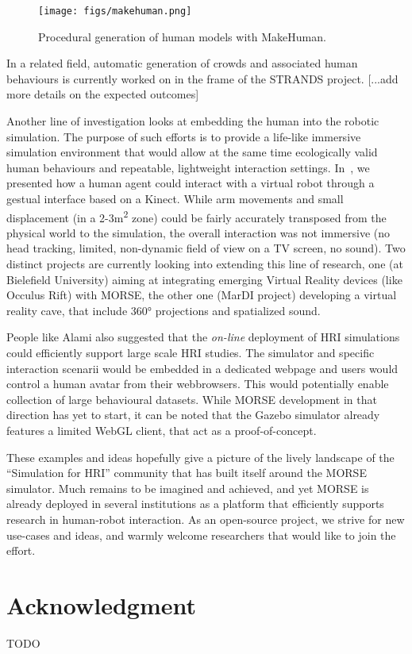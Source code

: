 \documentclass[conference]{IEEEtran}
\begin{document}
\begin{figure}[tb]
  \centering
  \texttt{[image: figs/makehuman.png]}
  \caption{Procedural generation of human models with {\sc MakeHuman}.}
  \label{fig:makehuman}
\end{figure}

In a related field, automatic generation of crowds and associated human
behaviours is currently worked on in the frame of the STRANDS project.
[...add more details on the expected outcomes]

Another line of investigation looks at embedding the human into the robotic
simulation. The purpose of such efforts is to provide a life-like immersive
simulation environment that would allow at the same time ecologically valid
human behaviours and repeatable, lightweight interaction settings.
In~\cite{lemaignan2012morse}, we presented how a human agent could interact with
a virtual robot through a gestual interface based on a Kinect. While arm
movements and small displacement (in a 2-3m\textsuperscript{2} zone) could be fairly
accurately transposed from the physical world to the simulation, the overall
interaction was not immersive (no head tracking, limited, non-dynamic field of
view on a TV screen, no sound). Two distinct projects are currently looking into
extending this line of research, one (at Bielefield University) aiming at
integrating emerging Virtual Reality devices (like Occulus Rift) with MORSE, the
other one (MarDI project) developing a virtual reality cave, that include 360°
projections and spatialized sound.

People like Alami also suggested that the \emph{on-line} deployment of HRI
simulations could efficiently support large scale HRI studies. The simulator and
specific interaction scenarii would be embedded in a dedicated webpage and users
would control a human avatar from their webbrowsers. This would potentially
enable collection of large behavioural datasets. While MORSE development in
that direction has yet to start, it can be noted that the Gazebo simulator
already features a limited WebGL client, that act as a proof-of-concept.

These examples and ideas hopefully give a picture of the lively landscape of the
``Simulation for HRI'' community that has built itself around the MORSE
simulator. Much remains to be imagined and achieved, and yet MORSE is already
deployed in several institutions as a platform that efficiently supports
research in human-robot interaction. As an open-source project, we strive for
new use-cases and ideas, and warmly welcome researchers that would like to join
the effort.

\section*{Acknowledgment}
TODO



\end{document}
